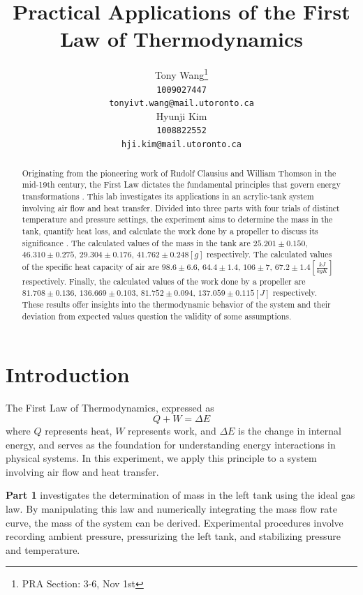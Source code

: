 \documentclass[12pt]{article}
\title{Practical Applications of the First Law of Thermodynamics}
\author{
Tony Wang\thanks{PRA Section: 3-6, Nov 1st} \\
\texttt{1009027447} \\
\texttt{tonyivt.wang@mail.utoronto.ca} \\
\And
Hyunji Kim \\
\texttt{1008822552} \\
\texttt{hji.kim@mail.utoronto.ca} \\
}
\begin{document}
\maketitle
\begin{abstract}
Originating from the pioneering work of Rudolf Clausius and William Thomson in the mid-19th century, the First Law dictates the fundamental principles that govern energy transformations \autocite{cai2005first}. This lab investigates its applications in an acrylic-tank system involving air flow and heat transfer. Divided into three parts with four trials of distinct temperature and pressure settings, the experiment aims to determine the mass in the tank, quantify heat loss, and calculate the work done by a propeller to discuss its significance \autocite{che}. The calculated values of the mass in the tank are $25.201\pm0.150$, $46.310\pm0.275$, $29.304\pm0.176$, $41.762\pm0.248[g]$ respectively. The calculated values of the specific heat capacity of air are $98.6\pm6.6$, $64.4\pm1.4$, $106\pm7$, $67.2\pm1.4[\frac{kJ}{kgK}]$ respectively. Finally, the calculated values of the work done by a propeller are $81.708\pm0.136$, $136.669\pm0.103$, $81.752\pm0.094$, $137.059\pm0.115[J]$ respectively. These results offer insights into the thermodynamic behavior of the system and their deviation from expected values question the validity of some assumptions.
\end{abstract}
\newpage

\section*{Introduction}
The First Law of Thermodynamics, expressed as 
\begin{equation}
    Q + W = \Delta E
    \label{eq:firstlaw}
\end{equation}
where $Q$ represents heat, $W$ represents work, and $\Delta E$ is the change in internal energy, and serves as the foundation for understanding energy interactions in physical systems. In this experiment, we apply this principle to a system involving air flow and heat transfer\autocite{chandra2016energy}.

\textbf{Part 1} investigates the determination of mass in the left tank using the ideal gas law. By manipulating this law and numerically integrating the mass flow rate curve, the mass of the system can be derived. Experimental procedures involve recording ambient pressure, pressurizing the left tank, and stabilizing pressure and temperature.
\end{document}
